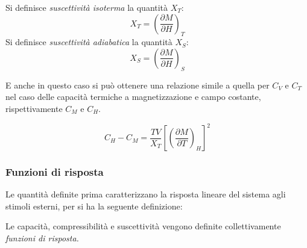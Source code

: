 \begin{defn}[Suscettività]
	Si definisce \textit{suscettività isoterma} la quantità $X_T$:
	\begin{equation*}
	X_T = \left(\frac{\partial M}{\partial H}\right)_T
	\end{equation*}
	Si definisce \textit{suscettività adiabatica} la quantità $X_S$:
	\begin{equation*}
	X_S = \left(\frac{\partial M}{\partial H}\right)_S
	\end{equation*}
\end{defn}

E anche in questo caso si può ottenere una relazione simile a quella per $C_V$ e $C_T$ nel caso delle capacità termiche a magnetizzazione e campo costante, rispettivamente $C_M$ e $C_H$. 

\begin{equation*}
C_H - C_M = \frac{T V}{X_T} \left[\left(\frac{\partial M}{\partial T}\right)_H\right]^2
\end{equation*}

\subsubsection{Funzioni di risposta} Le quantità definite prima caratterizzano la risposta lineare del sistema agli stimoli esterni, per si ha la seguente definizione:

\begin{defn}
	Le capacità, compressibilità e suscettività vengono definite collettivamente \textit{funzioni di risposta.}
\end{defn} 

